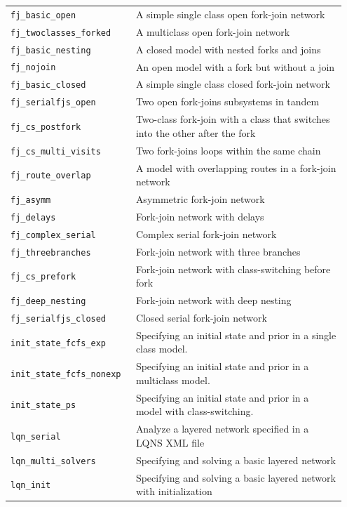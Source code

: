 \begin{footnotesize}
\begin{longtable}{|p{0.35\linewidth}|p{0.60\linewidth}|}
\hline
\texttt{fj\_basic\_open} & A simple single class open fork-join network\\
\texttt{fj\_twoclasses\_forked} & A multiclass open fork-join network\\
\texttt{fj\_basic\_nesting} & A closed model with nested forks and joins\\
\texttt{fj\_nojoin} & An open model with a fork but without a join\\
\texttt{fj\_basic\_closed} & A simple single class closed fork-join network\\
\texttt{fj\_serialfjs\_open} & Two open fork-joins subsystems in tandem\\
\texttt{fj\_cs\_postfork} & Two-class fork-join with a class that switches into the other after the fork\\
\texttt{fj\_cs\_multi\_visits} & Two fork-joins loops within the same chain\\
\texttt{fj\_route\_overlap} & A model with overlapping routes in a fork-join network\\
\texttt{fj\_asymm} & Asymmetric fork-join network\\
\texttt{fj\_delays} & Fork-join network with delays\\
\texttt{fj\_complex\_serial} & Complex serial fork-join network\\
\texttt{fj\_threebranches} & Fork-join network with three branches\\
\texttt{fj\_cs\_prefork} & Fork-join network with class-switching before fork\\
\texttt{fj\_deep\_nesting} & Fork-join network with deep nesting\\
\texttt{fj\_serialfjs\_closed} & Closed serial fork-join network\\
\hline
\texttt{init\_state\_fcfs\_exp} &  Specifying an initial state and prior in a single class model.\\
\texttt{init\_state\_fcfs\_nonexp} &  Specifying an initial state and prior in a multiclass model.\\
\texttt{init\_state\_ps} &  Specifying an initial state and prior in a model with class-switching.\\
\hline
\texttt{lqn\_serial} & Analyze a layered network specified in a LQNS XML file \\
\texttt{lqn\_multi\_solvers} & Specifying and solving a basic layered network\\
\texttt{lqn\_init} & Specifying and solving a basic layered network with initialization\\

\end{longtable}
\end{footnotesize}
